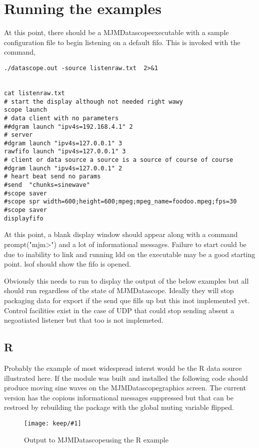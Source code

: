 \documentclass[aps,secnumarabic,balancelastpage,amsmath,amssymb,nofootinbib]{revtex4}
\newcommand{\mjmprod}{MJMDatascope}
\newcommand{\mjmpicture}[3]
{
\begin{figure}[H]
{ \texttt{[image: keep/\#1]} }
\caption{#2}
\label{fig:#3}
\end{figure}
} %
\begin{document}
\section{ Running the examples  }

At this point, there should be a \mjmprod executable
with a sample configuration file to begin listening on 
a default fifo. This is invoked with the command, 

\begin{lstlisting}
./datascope.out -source listenraw.txt  2>&1 


cat listenraw.txt 
# start the display although not needed right wawy
scope launch
# data client with no parameters
##dgram launch "ipv4s=192.168.4.1" 2 
# server 
#dgram launch "ipv4s=127.0.0.1" 3 
rawfifo launch "ipv4s=127.0.0.1" 3 
# client or data source a source is a source of course of course
#dgram launch "ipv4s=127.0.0.1" 2 
# heart beat send no params 
#send  "chunks=sinewave"
#scope saver
#scope spr width=600;height=600;mpeg;mpeg_name=foodoo.mpeg;fps=30 
#scope saver
displayfifo

\end{lstlisting}

At this point, a blank display window should appear along
with a command prompt("mjm>") and a lot of informational
messages. Failure to start could be due to inability to link
and running ldd on the executable may be a good starting point. 
lsof should show the fifo is opened. 

Obviously this needs to run to display the output of the below
examples but all should run regardless of the state
of \mjmprod. Ideally they will stop packaging data
for export if the send que fills up but this inot implemented
yet. Control facilities exist in the case of UDP that could stop
sending absent a negoatiated listener but that too is not implemeted. 


\subsection{ R }

Probably the example of most widespread interst would
be the R data source illustrated here. If the module was
built and installed the following code should
produce moving sine waves on the \mjmprod graphics screen.
The current version has the copious informational messages
suppressed but that can be restroed by rebuilding
the package with the global muting variable flipped. 


\mjmpicture{Rdscope.jpeg}{Output to \mjmprod using the R example}{Rdscope}
\end{document}

